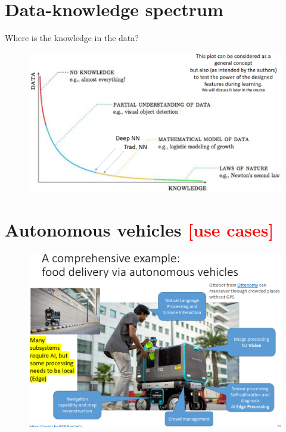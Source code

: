 \section{Data-knowledge spectrum}
Where is the knowledge in the data?

\begin{figure}[H]
    \centering
    \includegraphics[width=0.8\linewidth]{01/images/dat-knowledge spectrum.png}
\end{figure}

\section{Autonomous vehicles \textcolor{red}{[use cases]}}

\begin{figure}[H]
    \centering
    \includegraphics[width=1\linewidth]{01/images/use-case.png}
\end{figure}



